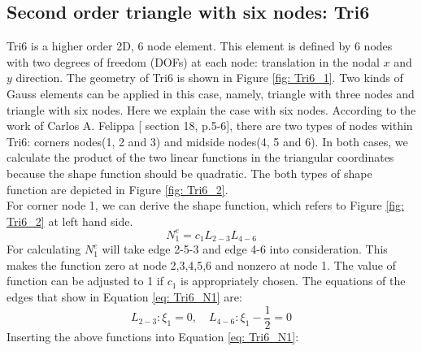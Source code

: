 \subsection{Second order triangle with six nodes: Tri6}
Tri6 is a higher order 2D, 6 node element. This element is defined by 6 nodes with two degrees of freedom (DOFs) at each node: translation in the nodal $x$ and $y$ direction. The geometry of Tri6 is shown in Figure \ref{fig: Tri6_1}.  Two kinds of Gauss elements can be applied in this case, namely, triangle with three nodes and triangle with six nodes. Here we explain the case with six nodes.  According to the work of Carlos A. Felippa [\cite{Felippa} section 18, p.5-6], there are two types of nodes within Tri6: corners nodes(1, 2 and 3) and midside nodes(4, 5 and 6). In both cases, we calculate the product of the two linear functions in the triangular coordinates because the shape function should be quadratic. The both types of shape function are depicted in Figure \ref{fig: Tri6_2}. \\
For corner node 1, we can derive the shape function, which refers to Figure \ref{fig: Tri6_2} at left hand side.
\begin{equation} \label{eq: Tri6_N1}
N_1^e = c_1L_{2-3}L_{4-6}
\end{equation}
For calculating $N_1^e$ will take edge 2-5-3 and edge 4-6 into consideration. This makes the function zero at node 2,3,4,5,6 and nonzero at node 1. The value of function can be adjusted to 1 if $c_1$ is appropriately chosen. The equations of the edges that show in Equation \ref{eq: Tri6_N1} are:
\begin{equation}
L_{2-3}: \xi_1 = 0, \quad L_{4-6}: \xi_1 - \frac{1}{2} = 0
\end{equation}
Inserting the above functions into Equation \ref{eq: Tri6_N1}:


